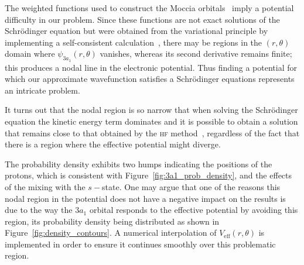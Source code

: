 The weighted functions used to construct the Moccia
orbitals~\cite{Moccia_1964} imply a potential difficulty in our
problem. Since these functions are not exact solutions of the
Schr\"{o}dinger equation but were obtained from the variational
principle by implementing a self-consistent
calculation~\cite{Moccia_JCP_2164}, there may be regions in the
$(r,\theta)$ domain where $\psi_{3a_{1}}(r,\theta)$ vanishes, whereas
its second derivative remains finite; this produces a nodal line in
the electronic potential. Thus finding a potential for which our
approximate wavefunction satisfies a Schr\"{o}dinger equations
represents an intricate problem.

It turns out that the nodal region is so narrow that when solving the
Schr\"{o}dinger equation the kinetic energy term dominates and it is
possible to obtain a solution that remains close to that obtained by
the \textsc{hf} method~\cite{Moccia_1964}, regardless of the fact that
there is a region where the effective potential might diverge.

The probability density exhibits two humps indicating the positions of
the protons, which is consistent with
Figure~\ref{fig:3a1_prob_density}, and the effects of the mixing with
the $s-$state. One may argue that one of the reasons this nodal region
in the potential does not have a negative impact on the results is due
to the way the $3a_{1}$ orbital responds to the effective potential by
avoiding this region, its probability density being distributed as
shown in Figure~\ref{fig:density_contours}. A numerical interpolation
of $V_{\mathrm{eff}}(r,\theta)$ is implemented in order to ensure it
continues smoothly over this problematic region.

